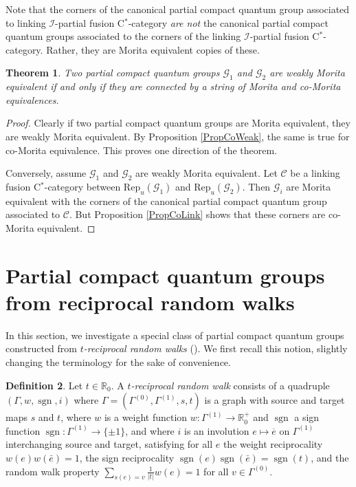 \documentclass[10pt]{article}
\DeclareMathOperator{\sgn}{\mathrm{sgn}}
\newcommand{\R}{\mathbb{R}}
\newcommand{\CatCC}{\mathscr{C}}
\newcommand{\Rep}{\mathrm{Rep}}
\newtheorem{Theorem}{Theorem}[section]
\theoremstyle{definition}
\newtheorem{Def}[Theorem]{Definition}
\numberwithin{equation}{section}
\begin{document}
Note that the corners of the canonical partial compact quantum group associated to linking $\mathscr{I}$-partial fusion C$^*$-category \emph{are not} the canonical partial compact quantum groups associated to the corners of the linking $\mathscr{I}$-partial fusion C$^*$-category. Rather, they are Morita equivalent copies of these.

\begin{Theorem} Two partial compact quantum groups $\mathscr{G}_1$ and $\mathscr{G}_2$ are weakly Morita equivalent if and only if they are connected by a string of Morita and co-Morita equivalences. 
\end{Theorem}

\begin{proof} Clearly if two partial compact quantum groups are Morita
  equivalent, they are weakly Morita equivalent. By Proposition
  \ref{PropCoWeak}, the same is true for co-Morita equivalence. This proves one direction of the theorem. 

Conversely, assume $\mathscr{G}_1$ and $\mathscr{G}_2$ are weakly Morita equivalent. Let $\CatCC$ be a linking fusion C$^*$-category between $\Rep_u(\mathscr{G}_1)$ and $\Rep_u(\mathscr{G}_2)$. Then $\mathscr{G}_i$ are Morita equivalent with the corners of the canonical partial compact quantum group associated to $\CatCC$. But Proposition \ref{PropCoLink} shows that these corners are co-Morita equivalent. 
\end{proof} 


\section{Partial compact quantum groups from reciprocal random walks}\label{SecDyn}

In this section, we investigate a special class of partial compact quantum groups constructed from \emph{$t$-reciprocal random walks} (\cite{DCY1}). We first recall this notion, slightly changing the terminology for the sake of convenience.

\begin{Def} Let $t\in \R_0$. A \emph{$t$-reciprocal random walk} consists of a quadruple $(\Gamma,w,\sgn,i)$ where $\Gamma=(\Gamma^{(0)},\Gamma^{(1)},s,t)$ is a graph with source and target maps $s$ and $t$, where $w$ is a weight function $w:\Gamma^{(1)}\rightarrow \R_0^+$ and $\sgn$ a sign function $\sgn:\Gamma^{(1)}\rightarrow \{\pm 1\}$, and where $i$ is an involution  $e\mapsto \overline{e}$ on $\Gamma^{(1)}$ interchanging source and target,  satisfying for all $e$ the weight reciprocality $w(e)w(\bar{e}) = 1$, the sign reciprocality $\sgn(e)\sgn(\bar{e}) = \sgn(t)$, and the random walk property $\sum_{s(e)=v}  \frac{1}{|t|}w(e) = 1$ for all $v\in \Gamma^{(0)}$.
\end{Def}
 
\end{document}
